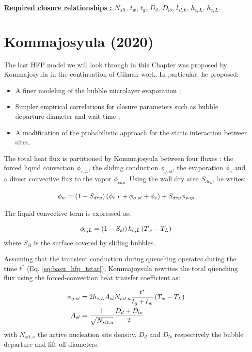 \npar

\textbf{\underline{Required closure relationships : }} $N_{sit}$, $t_{w}$, $t_{g}$, $D_{d}$, $D_{lo}$, $l_{sl,0}$, $h_{c,L}$, $\overline{h_{c,L}}$. 



\section{Kommajosyula (2020)}
\label{sec:hfp_komma}

The last HFP model we will look through in this Chapter was proposed by Kommajosyula \cite{kommajosyula_development_2020} in the continuation of Gilman \cite{gilman_development_2014} work. In particular, he proposed:

\begin{itemize}
\item A finer modeling of the bubble microlayer evaporation ;
\item Simpler empirical correlations for closure parameters such as bubble departure diameter and wait time ;
\item A modification of the probabilistic approach for the static interaction between sites.
\end{itemize}

The total heat flux is partitioned by Kommajosyula between four fluxes : the forced liquid convection $\phi_{c,L}$, the sliding conduction $\phi_{q,sl}$, the evaporation $\phi_{e}$ and a direct convective flux to the vapor $\phi_{vap}$. Using the wall dry area $S_{dry}$, he writes:

\begin{equation}
\phi_{w} = \left( 1-S_{dry} \right)\left( \phi_{c,L} + \phi_{q,sl} + \phi_{e} \right) + S_{dry} \phi_{vap}
\end{equation}

The liquid convective term is expressed as:

\begin{equation}
\phi_{c,L} = \left( 1-S_{sl} \right)h_{c,L}\left( T_{w} - T_{L} \right)
\end{equation}
where $S_{sl}$ is the surface covered by sliding bubbles.

\npar

Assuming that the transient conduction during quenching operates during the time $t^{*}$ (Eq. \ref{eq:basu_hfp_tstar}), Kommajoysula rewrites the total quenching flux using the forced-convection heat transfer coefficient as:

\begin{align}
\phi_{q,sl} &= 2 h_{c,L} A_{sl} N_{sit,a} \frac{t^{*}}{t_{g}+t_{w}}\left( T_{w}-T_{L} \right)\\
A_{sl} &= \dfrac{1}{\sqrt{N_{sit,a}}} \frac{D_{d} + D_{lo}}{2}
\end{align}
with $N_{sit,a}$ the active nucleation site density, $D_{d}$ and $D_{lo}$ respectively the bubble departure and lift-off diameters.

